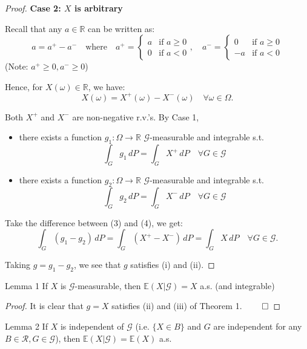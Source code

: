 \begin{proof}
\textbf{Case 2: \(X\) is arbitrary}

Recall that any \(a \in \mathbb{R}\) can be written as:
\[
a = a^+ - a^- \quad \text{where} \quad 
a^+ = 
\begin{cases} 
a & \text{if } a \ge 0 \\
0 & \text{if } a < 0 
\end{cases}
, \quad 
a^- = 
\begin{cases} 
0 & \text{if } a \ge 0 \\
-a & \text{if } a < 0 
\end{cases}
\]
(Note: \(a^+ \ge 0, a^- \ge 0\))

Hence, for \(X(\omega) \in \mathbb{R}\), we have:
\[
X(\omega) = X^+(\omega) - X^-(\omega) \quad \forall \omega \in \Omega.
\]

Both \(X^+\) and \(X^-\) are non-negative r.v.'s. By Case 1,

\begin{itemize}
    \item there exists a function \(g_1: \Omega \to \mathbb{R}\) \(\mathcal{G}\)-measurable and integrable s.t.
    \[
    \int_G g_1 \, dP = \int_G X^+ \, dP \quad \forall G \in \mathcal{G} \tag{3}
    \]
    \item there exists a function \(g_2: \Omega \to \mathbb{R}\) \(\mathcal{G}\)-measurable and integrable s.t.
    \[
    \int_G g_2 \, dP = \int_G X^- \, dP \quad \forall G \in \mathcal{G} \tag{4}
    \]
\end{itemize}

Take the difference between (3) and (4), we get:
\[
\int_G (g_1 - g_2) \, dP = \int_G (X^+ - X^-) \, dP = \int_G X \, dP \quad \forall G \in \mathcal{G}.
\]

Taking \(g = g_1 - g_2\), we see that \(g\) satisfies (i) and (ii).
\end{proof}

\begin{lemma}{Lemma 1}
    If \(X\) is \(\mathcal{G}\)-measurable, then \(\mathbb{E}(X|\mathcal{G}) = X \) a.s. (and integrable)
\end{lemma}


\begin{proof}
It is clear that \(g = X\) satisfies (ii) and (iii) of Theorem 1. \(\qed\)
\end{proof}
\begin{lemma}{Lemma 2}
   If \(X\) is independent of \(\mathcal{G}\) (i.e. \(\{X \in B\}\) and \(G\) are independent for any \(B \in \mathcal{R}, G \in \mathcal{G}\)), then \(\mathbb{E}(X|\mathcal{G}) = \mathbb{E}(X) \) a.s. 
\end{lemma}


